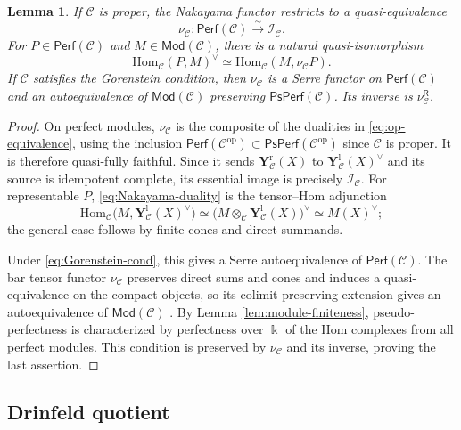 \documentclass[11pt,letterpaper,reqno]{amsart}
\theoremstyle{plain}
\newtheorem{lemma}[lemma]{Lemma}
\theoremstyle{definition}
\theoremstyle{plain}
\theoremstyle{definition}
\numberwithin{equation}{section}
\begin{document}
\begin{lemma}\label{lem:Nakayama-Serre}
If $\mathscr C$ is proper, the Nakayama functor restricts to a quasi-equivalence
\[
\nu_{\mathscr C}:\mathsf{Perf}(\mathscr C)\xrightarrow{\;\sim\;}\mathscr I_{\mathscr C}.
\]
For $P\in\mathsf{Perf}(\mathscr C)$ and $M\in\mathsf{Mod}(\mathscr C)$, there is a natural quasi-isomorphism
\begin{equation}\label{eq:Nakayama-duality}
\mathrm{Hom}_{\mathscr C}(P,M)^\vee
\simeq\mathrm{Hom}_{\mathscr C}(M,\nu_{\mathscr C}P).
\end{equation}
If $\mathscr C$ satisfies the Gorenstein condition, then $\nu_{\mathscr C}$ is a Serre functor on $\mathsf{Perf}(\mathscr C)$ and an autoequivalence of $\mathsf{Mod}(\mathscr C)$ preserving $\mathsf{PsPerf}(\mathscr C)$.
Its inverse is $\nu_{\mathscr C}^{\mathsf R}$.
\end{lemma}
\begin{proof}
On perfect modules, $\nu_{\mathscr C}$ is the composite of the dualities in \eqref{eq:op-equivalence}, using the inclusion $\mathsf{Perf}(\mathscr C^{\mathrm{op}})\subset\mathsf{PsPerf}(\mathscr C^{\mathrm{op}})$ since $\mathscr C$ is proper.
It is therefore quasi-fully faithful.
Since it sends $\mathbf Y_{\mathscr C}^{\mathrm r}(X)$ to $\mathbf Y_{\mathscr C}^{\mathrm l}(X)^\vee$ and its source is idempotent complete, its essential image is precisely $\mathscr I_{\mathscr C}$.
For representable $P$, \eqref{eq:Nakayama-duality} is the tensor--Hom adjunction
\[
\mathrm{Hom}_{\mathscr C}
\bigl(M,\mathbf Y_{\mathscr C}^{\mathrm l}(X)^\vee\bigr)
\simeq\bigl(M\otimes_{\mathscr C} \mathbf Y_{\mathscr C}^{\mathrm l}(X)\bigr)^\vee
\simeq M(X)^\vee;
\]
the general case follows by finite cones and direct summands.

Under \eqref{eq:Gorenstein-cond}, this gives a Serre autoequivalence of $\mathsf{Perf}(\mathscr C)$.
The bar tensor functor $\nu_{\mathscr C}$ preserves direct sums and cones and induces a quasi-equivalence on the compact objects, so its colimit-preserving extension gives an autoequivalence of $\mathsf{Mod}(\mathscr C)$ \cite[Lemma 3.10]{Keller2006b}.
By Lemma \ref{lem:module-finiteness}, pseudo-perfectness is characterized by perfectness over $\Bbbk$ of the Hom complexes from all perfect modules.
This condition is preserved by $\nu_{\mathscr C}$ and its inverse, proving the last assertion.
\end{proof}

\subsection{Drinfeld quotient}
\end{document}
